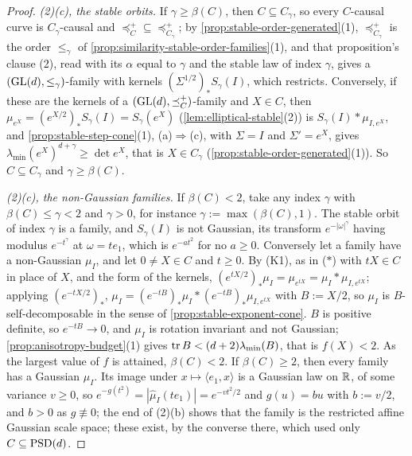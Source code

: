 \begin{proof}
\emph{(2)(c), the stable orbits.} If $\gamma \ge \beta(C)$, then $C \subseteq C_\gamma$, so every $C$-causal
curve is $C_\gamma$-causal and $\preceq^+_C \subseteq \preceq^+_{C_\gamma}$; by \ref{prop:stable-order-generated}(1),
$\preceq^+_{C_\gamma}$ is the order $\le_\gamma$ of \ref{prop:similarity-stable-order-families}(1), and that
proposition's clause (2), read with its $\alpha$ equal to $\gamma$ and the stable law of index $\gamma$, gives a
$(\mathrm{GL}(d), \le_\gamma)$-family with kernels $(\Sigma^{1/2})_*S_\gamma(I)$, which restricts. Conversely, if these
are the kernels of a $(\mathrm{GL}(d), \preceq^+_C)$-family and $X \in C$, then $\mu_{e^X} = (e^{X/2})_*S_\gamma(I) =
S_\gamma(e^X)$ (\ref{lem:elliptical-stable}(2)) is $S_\gamma(I) * \mu_{I,e^X}$, and
\ref{prop:stable-step-cone}(1), (a)$\Rightarrow$(c), with $\Sigma = I$ and $\Sigma' = e^X$, gives
$\lambda_{\min}(e^X)^{d+\gamma} \ge \det e^X$, that is $X \in C_\gamma$ (\ref{prop:stable-order-generated}(1)).
So $C \subseteq C_\gamma$ and $\gamma \ge \beta(C)$.

\emph{(2)(c), the non-Gaussian families.} If $\beta(C) < 2$, take any index $\gamma$ with
$\beta(C) \le \gamma < 2$ and $\gamma > 0$, for instance $\gamma := \max(\beta(C), 1)$. The
stable orbit of index $\gamma$ is a family, and $S_\gamma(I)$ is not Gaussian, its transform
$e^{-|\omega|^\gamma}$ having modulus $e^{-t^\gamma}$ at $\omega = te_1$, which is $e^{-at^2}$ for no $a \ge 0$.
Conversely let a family have a non-Gaussian $\mu_I$, and let $0 \ne X \in C$ and $t \ge 0$. By (K1), as in ($\ast$) with
$tX \in C$ in place of $X$, and the form of the kernels, $(e^{tX/2})_*\mu_I = \mu_{e^{tX}} = \mu_I * \mu_{I,e^{tX}}$; applying
$(e^{-tX/2})_*$, $\mu_I = (e^{-tB})_*\mu_I * (e^{-tB})_*\mu_{I,e^{tX}}$ with $B := X/2$, so $\mu_I$ is
$B$-self-decomposable in the sense of \ref{prop:stable-exponent-cone}. $B$ is positive definite, so
$e^{-tB} \to 0$, and $\mu_I$ is rotation invariant and not Gaussian; \ref{prop:anisotropy-budget}(1) gives
$\operatorname{tr} B < (d+2)\lambda_{\min}(B)$, that is $f(X) < 2$. As the largest value of $f$ is attained, $\beta(C) < 2$.
If $\beta(C) \ge 2$, then every family has a Gaussian $\mu_I$. Its image under $x \mapsto \langle e_1, x\rangle$
is a Gaussian law on $\mathbb{R}$, of some variance $v \ge 0$, so $e^{-g(t^2)} = |\widehat\mu_I(te_1)| = e^{-vt^2/2}$ and
$g(u) = bu$ with $b := v/2$, and $b > 0$ as $g \not\equiv 0$; the end of (2)(b) shows that the
family is the restricted affine Gaussian scale space; these exist, by the converse there, which used only
$C \subseteq \mathrm{PSD}(d)$.


\end{proof}
